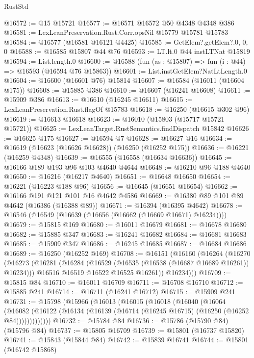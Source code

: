 \begin{lexlean}{RustStd}
\begin{coremodule}
@16572 := @15 @15721
@16577 := @16571 @16572 @50 @4348 @4348 @386
@16581 := LexLeanPreservation.Rust.Corr.opsNil @15779 @15781 @15783
@16584 := @16577 (@16581 @16121 @4425)
@16585 := GetElem?.getElem?.{0, 0, 0}
@16588 := @16585 @15807 @44 @76
@16593 := LT.lt.{0} @44 instLTNat @15819
@16594 := List.length.{0}
@16600 := @16588 (fun (as : @15807) => fun (i : @44) => @16593 (@16594 @76 @15863))
@16601 := List.instGetElem?NatLtLength.{0}
@16604 := @16600 (@16601 @76) @15814
@16607 := @16584 (@16011 (@16604 @175))
@16608 := @15885 @386
@16610 := @16607 (@16241 @16608)
@16611 := @15909 @386
@16613 := @16610 (@16245 @16611)
@16615 := LexLeanPreservation.Rust.flagOf @15783
@16618 := @16250 (@16615 @302 @96)
@16619 := @16613 @16618
@16623 := @16010 (@15803 (@15717 @15721 @15721))
@16625 := LexLeanTarget.RustSemantics.findDispatch @15842
@16626 := @16625 @175
@16627 := @16594 @7
@16628 := @16627 @16
@16634 := @16619 (@16623 (@16626 @16628)) (@16250 (@16252 @175))
@16636 := @16221 (@16259 @4348)
@16639 := @16555 (@16558 (@16634 @16636))
@16645 := @16166 @189 @193 @96 @103 @4640 @4644
@16648 := @16210 @96 @188 @4640
@16650 := @16216 (@16217 @4640)
@16651 := @16648 @16650
@16654 := @16221 (@16223 @188 @96)
@16656 := @16645 (@16651 @16654)
@16662 := @16166 @191 @121 @101 @16 @4642 @4586
@16669 := @16380 @89 @101 @89 @4642 (@16386 (@16388 @89))
@16671 := @16394 (@16395 @4642)
@16678 := @16546 (@16549 (@16639 (@16656 (@16662 (@16669 @16671) @16234))))
@16679 := @15815 @169
@16680 := @16011 @16679
@16681 := @16678 @16680
@16682 := @15885 @347
@16683 := @16241 @16682
@16684 := @16681 @16683
@16685 := @15909 @347
@16686 := @16245 @16685
@16687 := @16684 @16686
@16689 := @16250 (@16252 @169)
@16708 := @16151
    (@16160
      (@16264
        (@16270
          (@16273
            (@16281
              (@16284 (@16529 (@16535 (@16538 (@16687 @16689 @16261)) @16234)))
              @16516
              @16519
              @16522
              @16525
              @16261))
          @16234)))
@16709 := @15815 @84
@16710 := @16011 @16709
@16711 := @16708 @16710
@16712 := @15885 @241
@16714 := @16711 (@16241 @16712)
@16715 := @15909 @241
@16731 := @15798
    (@15966
      (@16013
        (@16015
          (@16018
            (@16040
              (@16064
                (@16082
                  (@16122 (@16134 (@16139 (@16714 (@16245 @16715) (@16250 (@16252 @84)))))))))))))
@16732 := @15784 @84
@16736 := @15786 (@15790 @84) (@15796 @84)
@16737 := @15805 @16709
@16739 := @15801 (@16737 @15820)
@16741 := @15843 (@15844 @84)
@16742 := @15839 @16741
@16744 := @15801 (@16742 @15868)

\end{coremodule}
\end{lexlean}
